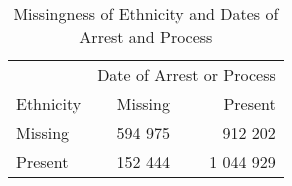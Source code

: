 \begin{table}[t]

\caption{\label{tab:missingness_of_ethnicity_and_date}Missingness of Ethnicity and Dates of Arrest and Process}
\centering
\begin{tabular}{lrr}
\toprule
\multicolumn{1}{c}{ } & \multicolumn{2}{c}{Date of Arrest or Process} \\
\cmidrule(l{2pt}r{2pt}){2-3}
Ethnicity & Missing & Present\\
\midrule
Missing & 594 975 & 912 202\\
Present & 152 444 & 1 044 929\\
\bottomrule
\end{tabular}
\end{table}